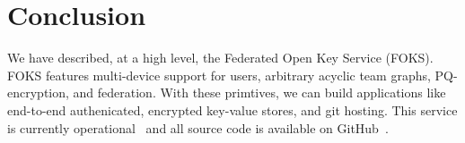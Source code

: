\documentclass[11pt]{article}
\begin{document}
\section{Conclusion}

We have described, at a high level, the Federated Open Key Service (FOKS).
FOKS features multi-device support for users, arbitrary acyclic team graphs,
PQ-encryption, and federation. With these primtives, we can build applications
like end-to-end authenicated, encrypted key-value stores, and git hosting.
This service is currently operational~\cite{foks-app} and all 
source code is available on GitHub~\cite{foks-github}.



\end{document}
